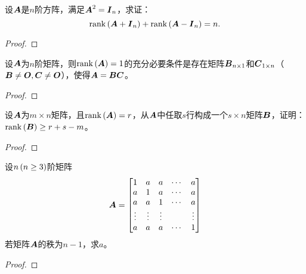 \begin{problem}\label{problem-1.28}
设\(\boldsymbol{A}\)是\(n\)阶方阵，满足\(\boldsymbol{A}^2=\boldsymbol{I}_n\)，求证：
\begin{equation*}
    \mathrm{rank}\left( \boldsymbol{A}+\boldsymbol{I}_n \right)+\mathrm{rank}\left( \boldsymbol{A}-\boldsymbol{I}_n \right)=n.
\end{equation*}
\end{problem}
\begin{proof}

\end{proof}

\begin{problem}\label{problem-1.29}
设\(\boldsymbol{A}\)为\(n\)阶矩阵，则\(\mathrm{rank}\left( \boldsymbol{A} \right)=1\)的充分必要条件是存在矩阵\(\boldsymbol{B}_{n\times1}\)和\(\boldsymbol{C}_{1\times n}\)（\(\boldsymbol{B}\neq\boldsymbol{O},\boldsymbol{C}\neq\boldsymbol{O}\)），使得\(\boldsymbol{A}=\boldsymbol{B}\boldsymbol{C}\)。
\end{problem}
\begin{proof}

\end{proof}

\begin{problem}\label{problem-1.30}
设\(\boldsymbol{A}\)为\(m\times n\)矩阵，且\(\mathrm{rank}\left( \boldsymbol{A} \right)=r\)，从\(\boldsymbol{A}\)中任取\(s\)行构成一个\(s\times n\)矩阵\(\boldsymbol{B}\)，证明：\(\mathrm{rank}\left( \boldsymbol{B} \right)\ge r+s-m\)。
\end{problem}
\begin{proof}

\end{proof}

\begin{problem}\label{problem-1.31}
设\(n\left( n\ge3 \right)\)阶矩阵
\begin{equation*}
    \boldsymbol{A}=
    \begin{bmatrix}
        1      & a      & a      & \cdots & a      \\
        a      & 1      & a      & \cdots & a      \\
        a      & a      & 1      & \cdots & a      \\
        \vdots & \vdots & \vdots &        & \vdots \\
        a      & a      & a      & \cdots & 1
    \end{bmatrix}
\end{equation*}
若矩阵\(\boldsymbol{A}\)的秩为\(n-1\)，求\(a\)。
\end{problem}
\begin{proof}

\end{proof}


